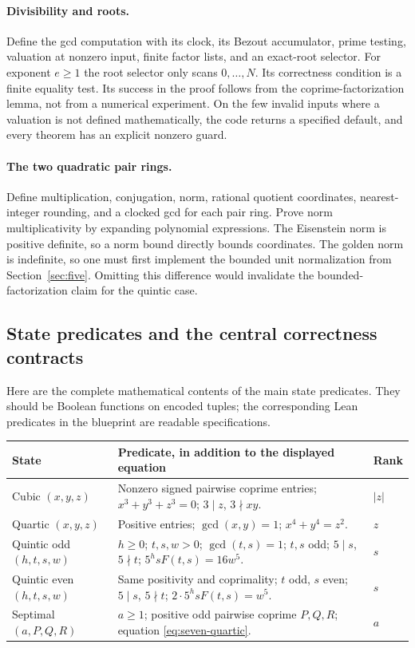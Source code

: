 \paragraph{Divisibility and roots.}
Define the gcd computation with its clock, its Bezout accumulator, prime
testing, valuation at nonzero input, finite factor lists, and an exact-root
selector. For exponent $e\geq1$ the root selector only scans $0,\ldots,N$.
Its correctness condition is a finite equality test. Its success in the
proof follows from the coprime-factorization lemma, not from a numerical
experiment. On the few invalid inputs where a valuation is not defined
mathematically, the code returns a specified default, and every theorem
has an explicit nonzero guard.

\paragraph{The two quadratic pair rings.}
Define multiplication, conjugation, norm, rational quotient coordinates,
nearest-integer rounding, and a clocked gcd for each pair ring. Prove norm
multiplicativity by expanding polynomial expressions. The Eisenstein norm
is positive definite, so a norm bound directly bounds coordinates. The
golden norm is indefinite, so one must first implement the bounded unit
normalization from Section~\ref{sec:five}. Omitting this difference would
invalidate the bounded-factorization claim for the quintic case.

\subsection{State predicates and the central correctness contracts}

Here are the complete mathematical contents of the main state predicates.
They should be Boolean functions on encoded tuples; the corresponding
Lean predicates in the blueprint are readable specifications.

\begin{center}
\small
\begin{tabular}{>{\raggedright\arraybackslash}p{}>{\raggedright\arraybackslash}p{}>{\raggedright\arraybackslash}p{}}
\toprule
State & Predicate, in addition to the displayed equation & Rank\\
\midrule
Cubic $(x,y,z)$ & Nonzero signed pairwise coprime entries;
$x^3+y^3+z^3=0$; $3\mid z$, $3\nmid xy$. & $|z|$\\
Quartic $(x,y,z)$ & Positive entries; $\gcd(x,y)=1$;
$x^4+y^4=z^2$. & $z$\\
Quintic odd $(h,t,s,w)$ & $h\geq0$; $t,s,w>0$;
$\gcd(t,s)=1$; $t,s$ odd; $5\mid s$, $5\nmid t$;
$5^h sF(t,s)=16w^5$. & $s$\\
Quintic even $(h,t,s,w)$ & Same positivity and coprimality;
$t$ odd, $s$ even; $5\mid s$, $5\nmid t$;
$2\cdot5^h sF(t,s)=w^5$. & $s$\\
Septimal $(a,P,Q,R)$ & $a\geq1$; positive odd pairwise coprime
$P,Q,R$; equation \eqref{eq:seven-quartic}. & $a$\\
\bottomrule
\end{tabular}
\end{center}

